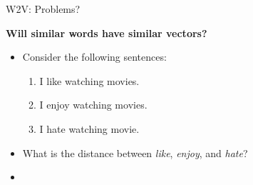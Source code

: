 \documentclass[professionalfonts, xcolor={usenames,svgnames,x11names,table}]{beamer}
\begin{document}
\begin{frame}{W2V: Problems?}
\begin{center}
          \alert{\textbf{Will similar words have similar vectors?}}
 \end{center}
 
\begin{itemize}
\item  Consider the following sentences: 

 \begin{enumerate}
\item I like watching movies.
\item I enjoy watching movies.
\item I hate watching movie.
\end{enumerate}
\end{itemize}

\begin{itemize}
\item What is the distance between \emph{like}, \emph{enjoy}, and \emph{hate}?
\end{itemize}

\vspace{0.2cm}
\begin{itemize}
\item {}
\end{itemize}
\end{frame}
\end{document}
